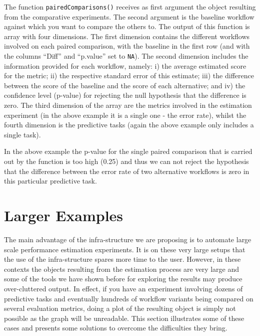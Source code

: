 \documentclass[10pt,a4paper]{article}\usepackage[]{graphicx}\usepackage[]{color}
\begin{document}
The function \texttt{pairedComparisons()} receives as first argument the
object resulting from the comparative experiments. The second argument
is the baseline workflow against which you want to compare the others
to. The output of this function is array with four dimensions. The first dimension contains the different workflows involved on each paired comparison, with the baseline in the first row (and with the columns ``Diff'' and ``p.value'' set to \texttt{NA}). The second dimension includes the information provided for each workflow, namely: i) the average estimated score for the metric; ii) the respective standard error of this estimate; iii) the difference between the score of the baseline and the score of each alternative; and iv) the confidence level (p-value) for rejecting the null hypothesis that the difference is zero.  The third dimension of the array are the metrics involved in the estimation experiment (in the above example it is a single one - the error rate), whilst the fourth dimension is the predictive tasks (again the above example only includes a single task).

In the above example the p-value for the single paired comparison that is carried out by the function is too high (0.25) and thus we can not reject the hypothesis that the difference between the error rate of two alternative workflows is zero in this particular predictive task.



\section{Larger Examples}

The main advantage of the infra-structure we are proposing is to
automate large scale performance estimation experiments. It is on these very
large setups that the use of the infra-structure spares more time to
the user. However, in these contexts the objects resulting from the
estimation process are very large and some of the tools we have shown before
for exploring the results may produce over-cluttered output. In
effect, if you have an experiment involving dozens of predictive tasks
and eventually hundreds of workflow variants being compared on several
evaluation metrics, doing a plot of the resulting object is simply not
possible as the graph will be unreadable. This section illustrates
some of these cases and presents some solutions to overcome the
difficulties they bring.
\end{document}
